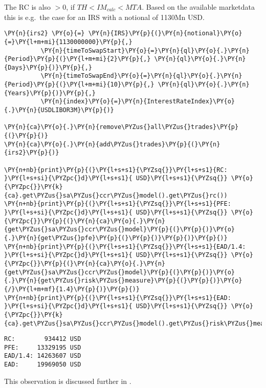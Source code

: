 The RC is also \(>0\), if \(TH < IM_{calc} < MTA\). Based on the
available marketdata this is e.g.~the case for an IRS with a notional of
1130Mn USD.

    \begin{tcolorbox}[breakable, size=fbox, boxrule=1pt, pad at break*=1mm,colback=cellbackground, colframe=cellborder]
\begin{Verbatim}[commandchars=\\\{\}]
\PY{n}{irs2} \PY{o}{=} \PY{n}{IRS}\PY{p}{(}\PY{n}{notional}\PY{o}{=}\PY{l+m+mi}{1130000000}\PY{p}{,}
          \PY{n}{timeToSwapStart}\PY{o}{=}\PY{n}{ql}\PY{o}{.}\PY{n}{Period}\PY{p}{(}\PY{l+m+mi}{2}\PY{p}{,} \PY{n}{ql}\PY{o}{.}\PY{n}{Days}\PY{p}{)}\PY{p}{,}
          \PY{n}{timeToSwapEnd}\PY{o}{=}\PY{n}{ql}\PY{o}{.}\PY{n}{Period}\PY{p}{(}\PY{l+m+mi}{10}\PY{p}{,} \PY{n}{ql}\PY{o}{.}\PY{n}{Years}\PY{p}{)}\PY{p}{,}
          \PY{n}{index}\PY{o}{=}\PY{n}{InterestRateIndex}\PY{o}{.}\PY{n}{USDLIBOR3M}\PY{p}{)}

\PY{n}{ca}\PY{o}{.}\PY{n}{remove\PYZus{}all\PYZus{}trades}\PY{p}{(}\PY{p}{)}
\PY{n}{ca}\PY{o}{.}\PY{n}{add\PYZus{}trades}\PY{p}{(}\PY{n}{irs2}\PY{p}{)}

\PY{n+nb}{print}\PY{p}{(}\PY{l+s+s1}{\PYZsq{}}\PY{l+s+s1}{RC:        }\PY{l+s+si}{\PYZpc{}d}\PY{l+s+s1}{ USD}\PY{l+s+s1}{\PYZsq{}} \PY{o}{\PYZpc{}}\PY{k}{ca}.get\PYZus{}sa\PYZus{}ccr\PYZus{}model().get\PYZus{}rc())
\PY{n+nb}{print}\PY{p}{(}\PY{l+s+s1}{\PYZsq{}}\PY{l+s+s1}{PFE:     }\PY{l+s+si}{\PYZpc{}d}\PY{l+s+s1}{ USD}\PY{l+s+s1}{\PYZsq{}} \PY{o}{\PYZpc{}}\PY{p}{(}\PY{n}{ca}\PY{o}{.}\PY{n}{get\PYZus{}sa\PYZus{}ccr\PYZus{}model}\PY{p}{(}\PY{p}{)}\PY{o}{.}\PY{n}{get\PYZus{}pfe}\PY{p}{(}\PY{p}{)}\PY{p}{)}\PY{p}{)}
\PY{n+nb}{print}\PY{p}{(}\PY{l+s+s1}{\PYZsq{}}\PY{l+s+s1}{EAD/1.4: }\PY{l+s+si}{\PYZpc{}d}\PY{l+s+s1}{ USD}\PY{l+s+s1}{\PYZsq{}} \PY{o}{\PYZpc{}}\PY{p}{(}\PY{n}{ca}\PY{o}{.}\PY{n}{get\PYZus{}sa\PYZus{}ccr\PYZus{}model}\PY{p}{(}\PY{p}{)}\PY{o}{.}\PY{n}{get\PYZus{}risk\PYZus{}measure}\PY{p}{(}\PY{p}{)}\PY{o}{/}\PY{l+m+mf}{1.4}\PY{p}{)}\PY{p}{)}
\PY{n+nb}{print}\PY{p}{(}\PY{l+s+s1}{\PYZsq{}}\PY{l+s+s1}{EAD:     }\PY{l+s+si}{\PYZpc{}d}\PY{l+s+s1}{ USD}\PY{l+s+s1}{\PYZsq{}} \PY{o}{\PYZpc{}}\PY{k}{ca}.get\PYZus{}sa\PYZus{}ccr\PYZus{}model().get\PYZus{}risk\PYZus{}measure())
\end{Verbatim}
\end{tcolorbox}

    \begin{Verbatim}[commandchars=\\\{\}]
RC:        934412 USD
PFE:     13329195 USD
EAD/1.4: 14263607 USD
EAD:     19969050 USD
    \end{Verbatim}

    This observation is discussed further in
.


